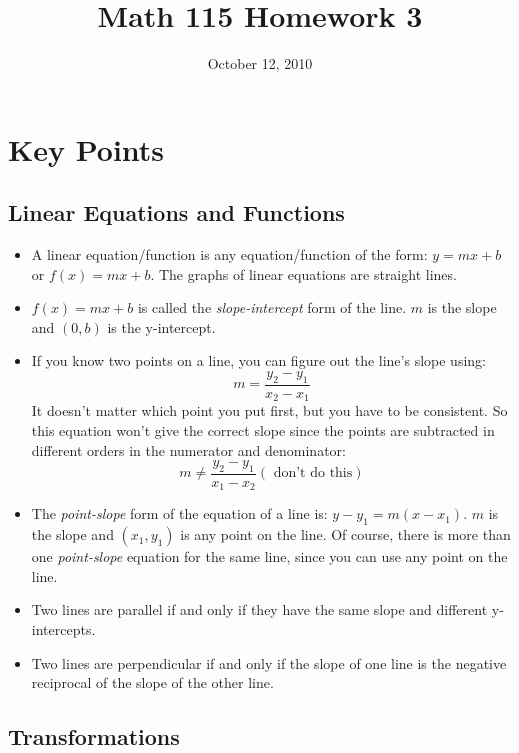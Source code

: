 \documentclass[fleqn,addpoints]{exam}
\title{Math 115 Homework 3}
\date{October 12, 2010}
\begin{document}
\maketitle

\ifprintanswers
\else

\section{Key Points}
\subsection{Linear Equations and Functions}

\begin{itemize}

\item A linear equation/function is any equation/function of the form: $y = mx + b$ or $f(x) = mx + b$.  The graphs of linear
  equations are straight lines.  

\item $f(x) = mx + b$ is called the {\em slope-intercept} form of the line.  $m$ is the slope and $(0, b)$ is the y-intercept.

\item If you know two points on a line, you can figure out the line's slope using:
\[
  m = \frac{y_2-y_1}{x_2-x_1}
\]
It doesn't matter which point you put first, but you have to be consistent.  So this equation won't give the correct
slope since the points are subtracted in different orders in the numerator and denominator:
\[
  m \ne \frac{y_2-y_1}{x_1-x_2} (\text{ don't do this})
\]

\item The {\em point-slope} form of the equation of a line is: $y - y_1 = m(x - x_1)$.  $m$ is the slope and 
  $(x_1, y_1)$ is any point on the line.  Of course, there is more than one {\em point-slope} equation for the same
  line, since you can use any point on the line.

\item Two lines are parallel if and only if they have the same slope and different y-intercepts.

\item Two lines are perpendicular if and only if the slope of one line is the negative reciprocal of the slope of the other line.

\end{itemize}

\subsection{Transformations}
\end{document}
